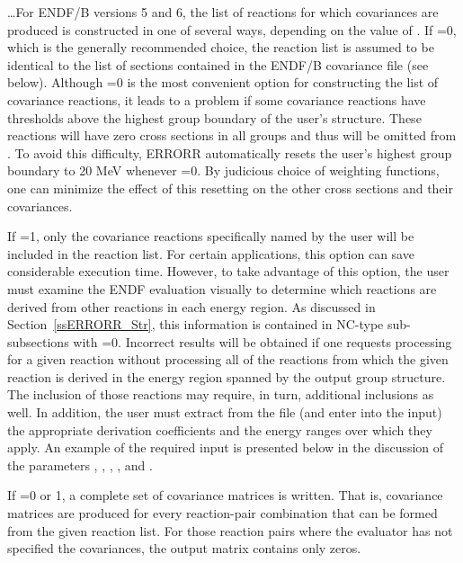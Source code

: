  \ldots\hspace{.1in}For ENDF/B versions 5 and 6, the list of
reactions for which covariances are produced is constructed in one of
several ways, depending on the value of .  If
=0, which is the generally recommended choice,
the reaction list is assumed to be identical to the list of sections
contained in the ENDF/B covariance file (see  below).
Although =0 is the most convenient option for constructing
the list of covariance reactions, it leads to a problem if some
covariance reactions have thresholds above the highest group boundary
of the user's structure.  These reactions will have zero cross sections
in all groups and thus will be omitted from .  To avoid
this difficulty, ERRORR automatically resets the user's highest group
boundary to 20 MeV whenever =0.  By judicious choice of
weighting functions, one can minimize the effect of this resetting on
the other cross sections and their covariances.

If =1, only the covariance reactions specifically
named by the user will be included in the reaction list.  For certain
applications, this option can save considerable execution time.
However, to take advantage of this option, the user must examine the
ENDF evaluation visually to determine which reactions are derived
from other reactions in each energy region.  As discussed in
Section~\ref{ssERRORR_Str}, this information is contained in NC-type
sub-subsections
with =0.  Incorrect results will be obtained if one requests
processing for a given reaction without processing all of the reactions
from which the given reaction is derived in the energy region spanned
by the output group structure.  The inclusion of those reactions may
require, in turn, additional inclusions as well.  In addition, the user
must extract from the file (and enter into the input) the appropriate
derivation coefficients and the energy ranges over which they
apply.  An example of the required input is presented below in the
discussion of the parameters , , ,
, and .

If =0 or 1, a complete set of covariance matrices
is written.  That is, covariance matrices are produced for
every reaction-pair combination that can be formed from the
given reaction list.  For those reaction pairs where the evaluator has
not specified the covariances, the output matrix contains only zeros.


